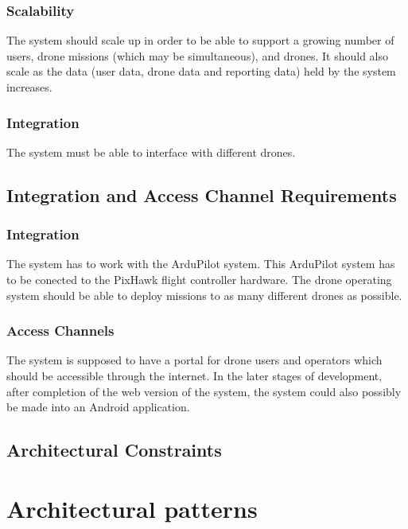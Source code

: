 \documentclass{article}
\begin{document}
			\subsubsection{Scalability}
			The system should scale up in order to be able to support a growing number of users, drone missions (which may be simultaneous), and drones. It should also scale as the data (user data, drone data and reporting data) held by the system increases.
			
			\subsubsection{Integration}
			The system must be able to interface with different drones.
		\subsection{Integration and Access Channel Requirements}%
		\subsubsection{Integration}
		The system has to work with the ArduPilot system. This ArduPilot system has to be conected to the PixHawk flight controller hardware. The drone operating system should be able to deploy missions to as many different drones as possible.
		\subsubsection{Access Channels}
		The system is supposed to have a portal for drone users and operators which should be accessible through the internet. In the later stages of development, after completion of the web version of the system, the system could also possibly be made into an Android application.
		\subsection{Architectural Constraints }%
	\section{Architectural patterns}%
\end{document}
